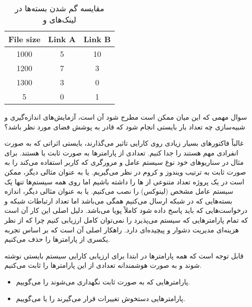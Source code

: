 \begin{LTR}
    \begin{table}[H]
        \centering
        \label{fig:packetLostLinks}
        \begin{tabular}{ccc}
            \textbf{File size} & \textbf{Link A} & \textbf{Link B} \\ \hline
            1000 & 5 & 10 \\
            1200 & 7 & 3 \\
            1300 & 3 & 0 \\
            5 & 0 & 1 \\ \hline
        \end{tabular}
        \caption{مقایسه گم شدن بسته‌ها در لینک‌های  و }
    \end{table}
\end{LTR}

سوال مهمی که این میان ممکن است مطرح شود آن است، آزمایش‌های اندازه‌گیری و
شبیه‌سازی چه تعداد بار بایستی انجام شود که قادر به پوشش فضای مورد نظر باشد؟

غالباً فاکتور‌های بسیار زیادی روی کارایی تاثیر می‌گذارند، بایستی اثراتی که به
صورت انفرادی مهم هستند را جدا کنیم. تعدادی از پارامتر‌ها به صورت ثابت یا
 هستند. برای مثال در سناریو‌های خود نوع سیستم عامل و مرورگری که کاربر
استفاده می‌کند را به صورت ثابت به ترتیب ویندوز و کروم در نظر می‌گیریم. یا به
عنوان مثالی دیگر، ممکن است در یک پروژه تعداد متنوعی از ها را داشته باشیم
اما روی همه سیستم‌ها تنها یک سیستم عامل مشخص (لینوکس) را نصب می‌کنیم. یا به
عنوان مثالی دیگر، اندازه بسته‌هایی که در شبکه ارسال می‌کنیم همگی 
می‌باشد اما تعداد ارتباطات شبکه و درخواست‌هایی که باید پاسخ داده شود کاملاً پویا
می‌باشد. دلیل اصلی این کار آن است که تمام پارامتر‌هایی که سیستم می‌پذیرد را
نمی‌توان کامل ارزیابی کنیم چرا که از نظر هزینه‌ای مدیریت دشوار و پیچیده‌ای دارد.
راهکار اصلی آن است که بر اساس تجربه یکسری از پارامتر‌ها را حذف می‌کنیم.

قابل توجه است که همه پارامتر‌ها در ابتدا برای ارزیابی کارایی سیستم بایستی نوشته
شوند و به صورت هوشمندانه تعدادی از این پارامتر‌ها را ثابت می‌کنیم.

\begin{itemize}
    \item پارامتر‌هایی که به صورت ثابت نگهداری می‌شوند را 
    می‌گوییم.
    \item پارامتر‌هایی دستخوش تغییرات قرار می‌گیرند را  یا
     می‌گوییم.
\end{itemize}

